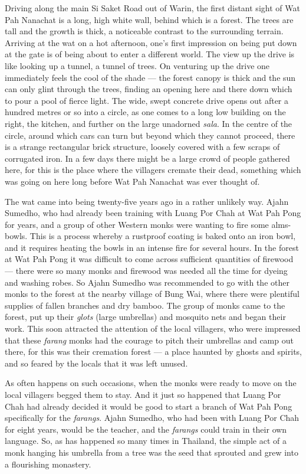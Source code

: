 Driving along the main Si Saket Road out of Warin, the first distant
sight of Wat Pah Nanachat is a long, high white wall, behind which is a
forest. The trees are tall and the growth is thick, a noticeable
contrast to the surrounding terrain. Arriving at the wat on a hot
afternoon, one's first impression on being put down at the gate is of
being about to enter a different world. The view up the drive is like
looking up a tunnel, a tunnel of trees. On venturing up the drive one
immediately feels the cool of the shade --- the forest canopy is thick
and the sun can only glint through the trees, finding an opening here
and there down which to pour a pool of fierce light. The wide, swept
concrete drive opens out after a hundred metres or so into a circle, as
one comes to a long low building on the right, the kitchen, and further
on the large unadorned \emph{sala}. In the centre of the circle, around
which cars can turn but beyond which they cannot proceed, there is a
strange rectangular brick structure, loosely covered with a few scraps
of corrugated iron. In a few days there might be a large crowd of people
gathered here, for this is the place where the villagers cremate their
dead, something which was going on here long before Wat Pah Nanachat was
ever thought of.

The wat came into being twenty-five years ago in a rather unlikely way.
Ajahn Sumedho, who had already been training with Luang Por Chah at Wat
Pah Pong for years, and a group of other Western monks were wanting to
fire some alms-bowls. This is a process whereby a rustproof coating is
baked onto an iron bowl, and it requires heating the bowls in an intense
fire for several hours. In the forest at Wat Pah Pong it was difficult
to come across sufficient quantities of firewood --- there were so many
monks and firewood was needed all the time for dyeing and washing robes.
So Ajahn Sumedho was recommended to go with the other monks to the
forest at the nearby village of Bung Wai, where there were plentiful
supplies of fallen branches and dry bamboo. The group of monks came to
the forest, put up their \emph{glots} (large umbrellas) and mosquito
nets and began their work. This soon attracted the attention of the
local villagers, who were impressed that these \emph{farang} monks had
the courage to pitch their umbrellas and camp out there, for this was
their cremation forest --- a place haunted by ghosts and spirits, and so
feared by the locals that it was left unused.

As often happens on such occasions, when the monks were ready to move on
the local villagers begged them to stay. And it just so happened that
Luang Por Chah had already decided it would be good to start a branch of
Wat Pah Pong specifically for the \emph{farangs}. Ajahn Sumedho, who had
been with Luang Por Chah for eight years, would be the teacher, and the
\emph{farangs} could train in their own language. So, as has happened so
many times in Thailand, the simple act of a monk hanging his umbrella
from a tree was the seed that sprouted and grew into a flourishing
monastery.


